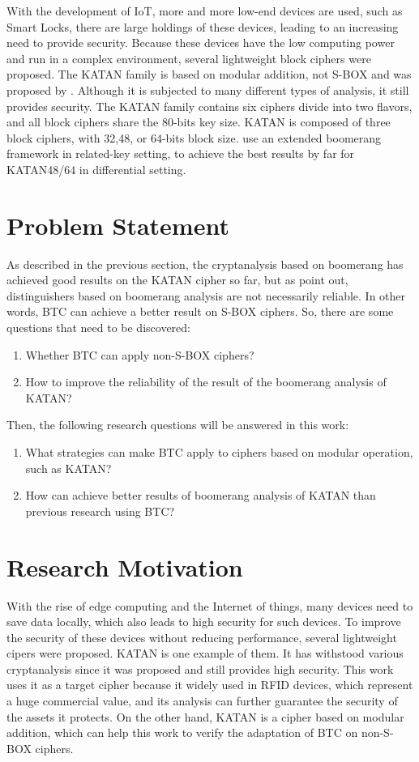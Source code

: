 With the development of IoT, more and more low-end devices are used, such as Smart Locks, there are large holdings of these devices, leading to an increasing need to provide security. Because these devices have the low computing power and run in a complex environment, several lightweight block ciphers were proposed. The KATAN family is based on modular addition, not S-BOX and was proposed by \cite{10.1007/978-3-642-04138-9_20}. Although it is subjected to many different types of analysis, it still provides security. The KATAN family contains six ciphers divide into two flavors, and all block ciphers share the 80-bits key size. KATAN is composed of three block ciphers, with 32,48, or 64-bits block size.  \cite{inproceedings} use an extended boomerang framework in related-key setting, to achieve the best results by far for KATAN48/64 in differential setting.




\section{Problem Statement}
As described in the previous section, the cryptanalysis based on boomerang has achieved good results \cite{inproceedings} on the KATAN cipher so far, but as \cite{5730575} point out, distinguishers based on boomerang analysis are not necessarily reliable. In other words, BTC \cite{10.1007/978-3-319-78375-8_22} can achieve a better result on S-BOX ciphers. So, there are some questions that need to be discovered:
\begin{enumerate}
    \item Whether BTC can apply non-S-BOX ciphers?
    \item How to improve the reliability of the result of the boomerang analysis of KATAN?
\end{enumerate}
Then, the following research questions will be answered in this work:
\begin{enumerate}
    \item What strategies can make BTC apply to ciphers based on modular operation, such as KATAN?
    \item How can achieve better results of boomerang analysis of KATAN than previous research using BTC?
\end{enumerate}


\section{Research Motivation}
With the rise of edge computing and the Internet of things, many devices need to save data locally, which also leads to high security for such devices. To improve the security of these devices without reducing performance, several lightweight cipers were proposed. KATAN is one example of them. It has withstood various cryptanalysis since it was proposed and still provides high security. This work uses it as a target cipher because it widely used in RFID devices, which represent a huge commercial value, and its analysis can further guarantee the security of the assets it protects. On the other hand, KATAN is a cipher based on modular addition, which can help this work to verify the adaptation of BTC on non-S-BOX ciphers. 

